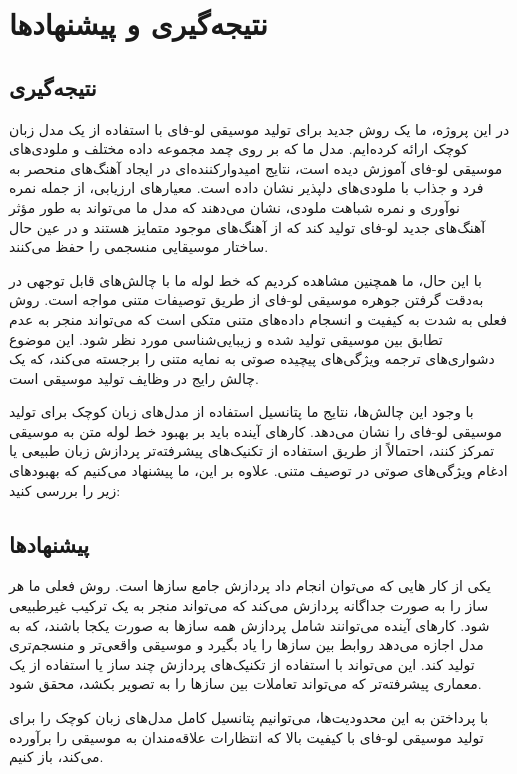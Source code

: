 
\chapter{نتیجه‌گیری و پیشنهادها}
\section{‌نتیجه‌گیری}

در این پروژه، ما یک روش جدید برای تولید موسیقی لو-فای با استفاده از یک مدل زبان کوچک ارائه کرده‌ایم. مدل ما که بر روی چمد مجموعه داده مختلف و ملودی‌های موسیقی لو-فای آموزش دیده است، نتایج امیدوارکننده‌ای در ایجاد آهنگ‌های منحصر به فرد و جذاب با ملودی‌های دلپذیر نشان داده است. معیارهای ارزیابی، از جمله نمره نوآوری و نمره شباهت ملودی، نشان می‌دهند که مدل ما می‌تواند به طور مؤثر آهنگ‌های جدید لو-فای تولید کند که از آهنگ‌های موجود متمایز هستند و در عین حال ساختار موسیقایی منسجمی را حفظ می‌کنند.

با این حال، ما همچنین مشاهده کردیم که خط لوله ما با چالش‌های قابل توجهی در به‌دقت گرفتن جوهره موسیقی لو-فای از طریق توصیفات متنی مواجه است. روش فعلی به شدت به کیفیت و انسجام داده‌های متنی متکی است که می‌تواند منجر به عدم تطابق بین موسیقی تولید شده و زیبایی‌شناسی مورد نظر شود. این موضوع دشواری‌های ترجمه ویژگی‌های پیچیده صوتی به نمایه متنی را برجسته می‌کند، که یک چالش رایج در وظایف تولید موسیقی است.

با وجود این چالش‌ها، نتایج ما پتانسیل استفاده از مدل‌های زبان کوچک برای تولید موسیقی لو-فای را نشان می‌دهد. کارهای آینده باید بر بهبود خط لوله متن به موسیقی تمرکز کنند، احتمالاً از طریق استفاده از تکنیک‌های پیشرفته‌تر پردازش زبان طبیعی یا ادغام ویژگی‌های صوتی در توصیف متنی. علاوه بر این، ما پیشنهاد می‌کنیم که بهبودهای زیر را بررسی کنید:


\section{پیشنهادها}

یکی از کار هایی که می‌توان انجام داد پردازش جامع سازها است. روش فعلی ما هر ساز را به صورت جداگانه پردازش می‌کند که می‌تواند منجر به یک ترکیب غیرطبیعی شود. کارهای آینده می‌توانند شامل پردازش همه سازها به صورت یکجا باشند، که به مدل اجازه می‌دهد روابط بین سازها را یاد بگیرد و موسیقی واقعی‌تر و منسجم‌تری تولید کند. این می‌تواند با استفاده از تکنیک‌های پردازش چند ساز یا استفاده از یک معماری پیشرفته‌تر که می‌تواند تعاملات بین سازها را به تصویر بکشد، محقق شود.

با پرداختن به این محدودیت‌ها، می‌توانیم پتانسیل کامل مدل‌های زبان کوچک را برای تولید موسیقی لو-فای با کیفیت بالا که انتظارات علاقه‌مندان به موسیقی را برآورده می‌کند، باز کنیم.